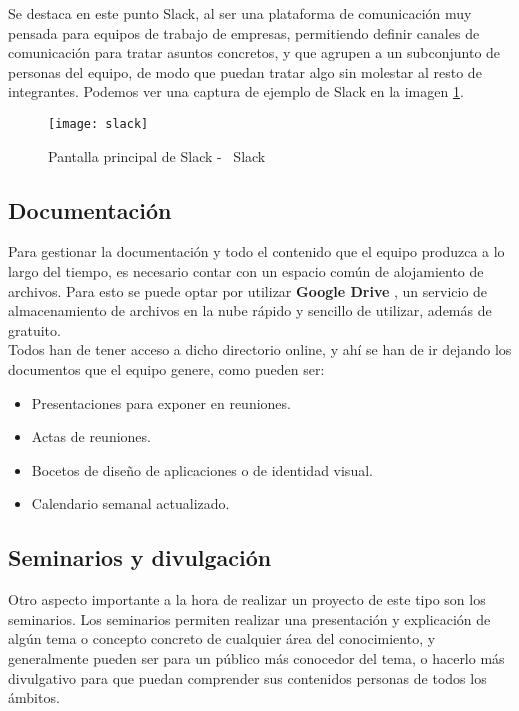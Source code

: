 Se destaca en este punto Slack, al ser una plataforma de comunicación muy pensada para equipos de trabajo de empresas, permitiendo definir canales de comunicación para tratar asuntos concretos, y que agrupen a un subconjunto de personas del equipo, de modo que puedan tratar algo sin molestar al resto de integrantes. Podemos ver una captura de ejemplo de Slack en la imagen \ref{slackimage}.

\begin{figure}
    \centering
    \texttt{[image: slack]}
    \caption{Pantalla principal de Slack - \textcopyright\ Slack}
    \label{slackimage}
\end{figure}

\subsection{Documentación}
Para gestionar la documentación y todo el contenido que el equipo produzca a lo largo del tiempo, es necesario contar con un espacio común de alojamiento de archivos. Para esto se puede optar por utilizar \textbf{Google Drive} \cite{googledrive}, un servicio de almacenamiento de archivos en la nube rápido y sencillo de utilizar, además de gratuito.\\

Todos han de tener acceso a dicho directorio online, y ahí se han de ir dejando los documentos que el equipo genere, como pueden ser:
\begin{itemize}
    \item Presentaciones para exponer en reuniones.
    \item Actas de reuniones.
    \item Bocetos de diseño de aplicaciones o de identidad visual.
    \item Calendario semanal actualizado.
\end{itemize}

\subsection{Seminarios y divulgación}
Otro aspecto importante a la hora de realizar un proyecto de este tipo son los seminarios. Los seminarios permiten realizar una presentación y explicación de algún tema o concepto concreto de cualquier área del conocimiento, y generalmente pueden ser para un público más conocedor del tema, o hacerlo más divulgativo para que puedan comprender sus contenidos personas de todos los ámbitos.\\

